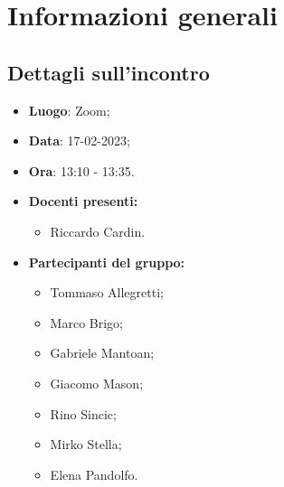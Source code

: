 \section{Informazioni generali}

\subsection{Dettagli sull'incontro}
\begin{itemize}
    \item \textbf{Luogo}: Zoom;
    \item \textbf{Data}: 17-02-2023;
    \item \textbf{Ora}: 13:10 - 13:35.
    \item \textbf{Docenti presenti:}
        \begin{itemize}
            \item Riccardo Cardin.
        \end{itemize}
    \item \textbf{Partecipanti del gruppo:}
        \begin{itemize}
            \item Tommaso Allegretti;
            \item Marco Brigo;
            \item Gabriele Mantoan;
            \item Giacomo Mason;
            \item Rino Sincic;
            \item Mirko Stella;
            \item Elena Pandolfo.
        \end{itemize}
\end{itemize}